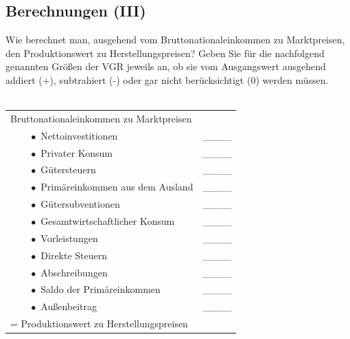\documentclass{scrartcl}
\begin{document}
\subsection{Berechnungen (III)}
Wie berechnet man, ausgehend vom Bruttonationaleinkommen zu Marktpreisen, den Produktionswert zu Herstellungspreisen? Geben Sie für die nachfolgend genannten Größen der VGR jeweils an, ob sie vom Ausgangswert ausgehend addiert (+), subtrahiert (-) oder gar nicht berücksichtigt (0) werden müssen.\\~\\
\begin{tabular}{ll}
	Bruttonationaleinkommen zu Marktpreisen & \\
	$\qquad\bullet$ Nettoinvestitionen &  \_\_\_\_ \\
	$\qquad\bullet$ Privater Konsum &  \_\_\_\_ \\
	$\qquad\bullet$ Gütersteuern &  \_\_\_\_ \\
	$\qquad\bullet$ Primäreinkommen aus dem Ausland &  \_\_\_\_ \\
	$\qquad\bullet$ Gütersubventionen &  \_\_\_\_ \\
	$\qquad\bullet$ Gesamtwirtschaftlicher Konsum &  \_\_\_\_ \\
	$\qquad\bullet$ Vorleistungen &  \_\_\_\_ \\
	$\qquad\bullet$ Direkte Steuern &  \_\_\_\_ \\
	$\qquad\bullet$ Abschreibungen &  \_\_\_\_ \\
	$\qquad\bullet$ Saldo der Primäreinkommen &  \_\_\_\_ \\
	$\qquad\bullet$ Außenbeitrag &  \_\_\_\_ \\
	= Produktionswert zu Herstellungspreisen  &
\end{tabular}
\end{document}
